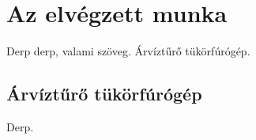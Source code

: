 \chapter{Az elvégzett munka}
Derp derp, valami szöveg\cite{Wettl04}. Árvíztűrő tükörfúrógép.


\section{Árvíztűrő tükörfúrógép}
Derp.



